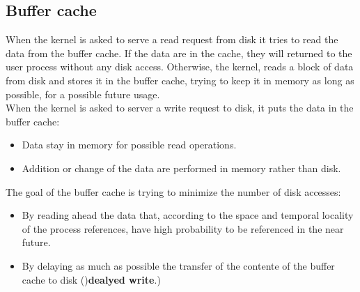 \documentclass[12pt]{article}
\begin{document}
\subsection{Buffer cache}
When the kernel is asked to serve a read request from disk it tries to read the data from the buffer cache. If the data are in the cache, they will returned to the user process without any disk access. Otherwise, the kernel, reads a block of data from disk and stores it in the buffer cache, trying to keep it in memory as long as possible, for a possible future usage.\\
When the kernel is asked to server a write request to disk, it puts the data in the buffer cache:
\begin{itemize}
  \item Data stay in memory for possible read operations.
  \item Addition or change of the data are performed in memory rather than disk.
\end{itemize}
The goal of the buffer cache is trying to minimize the number of disk accesses:
\begin{itemize}
  \item By reading ahead the data that, according to the space and temporal locality of the process references, have high probability to be referenced in the near future.
  \item By delaying as much as possible the transfer of the contente of the buffer cache to disk ()\textbf{dealyed write}.)
\end{itemize}
\end{document}
